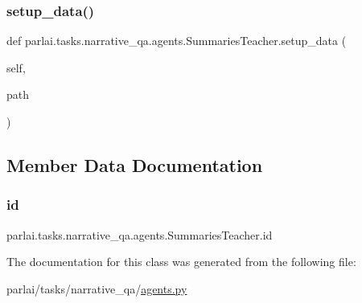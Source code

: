 \subsubsection{\texorpdfstring{setup\+\_\+data()}{setup\_data()}}
{\footnotesize\ttfamily def parlai.\+tasks.\+narrative\+\_\+qa.\+agents.\+Summaries\+Teacher.\+setup\+\_\+data (\begin{DoxyParamCaption}\item[{}]{self,  }\item[{}]{path }\end{DoxyParamCaption})}



\subsection{Member Data Documentation}
\mbox{\label{classparlai_1_1tasks_1_1narrative__qa_1_1agents_1_1SummariesTeacher_a00d240ba5d5d8c7ba0257dbbbc2ba58c}} 
\subsubsection{\texorpdfstring{id}{id}}
{\footnotesize\ttfamily parlai.\+tasks.\+narrative\+\_\+qa.\+agents.\+Summaries\+Teacher.\+id}



The documentation for this class was generated from the following file\+:\begin{DoxyCompactItemize}
\item 
parlai/tasks/narrative\+\_\+qa/\hyperlink{parlai_2tasks_2narrative__qa_2agents_8py}{agents.\+py}\end{DoxyCompactItemize}

